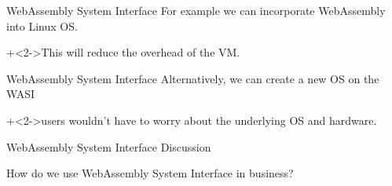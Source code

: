 \begin{frame}{WebAssembly System Interface}{}
    For example we can incorporate WebAssembly into Linux OS.
    \vspace{4ex}

    \onslide+<2->{This will reduce the overhead of the VM.}
\end{frame}


\begin{frame}{WebAssembly System Interface}{}
    Alternatively, we can create a new OS on the WASI
    \vspace{4ex}
    
    \onslide+<2->{users wouldn't have to worry about the underlying OS and hardware.}
\end{frame}


\begin{frame}{WebAssembly System Interface}{}
    Discussion
    \vspace{4ex}

    How do we use WebAssembly System Interface in business?
\end{frame}